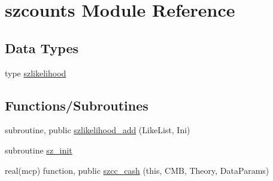 \hypertarget{namespaceszcounts}{}\section{szcounts Module Reference}
\label{namespaceszcounts}
\subsection*{Data Types}
\begin{DoxyCompactItemize}
\item 
type \mbox{\hyperlink{structszcounts_1_1szlikelihood}{szlikelihood}}
\end{DoxyCompactItemize}
\subsection*{Functions/\+Subroutines}
\begin{DoxyCompactItemize}
\item 
subroutine, public \mbox{\hyperlink{namespaceszcounts_a0c8563799b2d0ed9c6c98a8164fa46b9}{szlikelihood\+\_\+add}} (Like\+List, Ini)
\item 
subroutine \mbox{\hyperlink{namespaceszcounts_afa324b0c4ff10f2122b6d75541b4e204}{sz\+\_\+init}}
\item 
real(mcp) function, public \mbox{\hyperlink{namespaceszcounts_abc28ab0b8d2db0b6f91aa9b99cac694f}{szcc\+\_\+cash}} (this, C\+MB, Theory, Data\+Params)
\end{DoxyCompactItemize}
